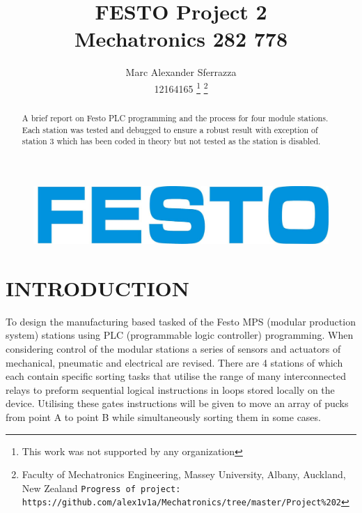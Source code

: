 \documentclass[a4paper, 10pt,  conference]{article}
\title{\LARGE \bf FESTO Project 2\\Mechatronics 282 778}
\author{Marc Alexander Sferrazza \\ 12164165
\thanks{This work was not supported by any organization}
\thanks{Faculty of Mechatronics Engineering, Massey University, Albany, Auckland, New Zealand
        {\tt\small Progress of project: https://github.com/alex1v1a/Mechatronics/tree/master/Project\%202} } }
\begin{document}
\maketitle

\begin{figure}[h!]
  \includegraphics[width=\linewidth]{images/FESTO-Logo}
  \label{fig:FESTO-Logo}
\end{figure}

\thispagestyle{empty}
\pagestyle{empty}



\begin{abstract}

A brief report on Festo PLC programming and the process for four module stations. Each station was tested and debugged to ensure a robust result with exception of station 3 which has been coded in theory but not tested as the station is disabled.

\end{abstract}


\clearpage
\tableofcontents
\clearpage



\section{INTRODUCTION}
To design the manufacturing based tasked of the Festo MPS (modular production system) stations using PLC (programmable logic controller) programming. When considering control of the modular stations a series of sensors and actuators of mechanical, pneumatic and electrical are revised. There are 4 stations of which each contain specific sorting tasks that utilise the range of many interconnected relays to preform sequential logical instructions in loops stored locally on the device. Utilising these gates instructions will be given to move an array of pucks from point A to point B while simultaneously sorting them in some cases.
\end{document}
